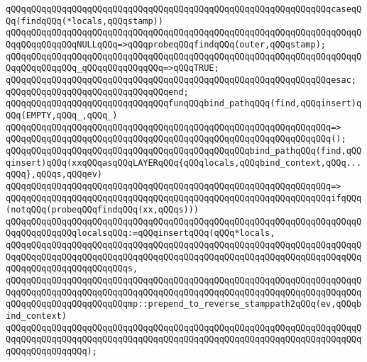\verb|qQQqqQQqqQQqqQQqqQQqqQQqqQQqqQQqqQQqqQQqqQQqqQQqqQQqqQQqqQQqqQQqcaseqQQq(findqQQq(*locals,qQQqstamp))|\newline
\verb|qQQqqQQqqQQqqQQqqQQqqQQqqQQqqQQqqQQqqQQqqQQqqQQqqQQqqQQqqQQqqQQqqQQqqQQqqQQqqQQqqQQqNULLqQQq=>qQQqprobeqQQqfindqQQq(outer,qQQqstamp);|\newline
\verb|qQQqqQQqqQQqqQQqqQQqqQQqqQQqqQQqqQQqqQQqqQQqqQQqqQQqqQQqqQQqqQQqqQQqqQQqqQQqqQQqqQQq_qQQqqQQqqQQqqQQq=>qQQqTRUE;|\newline
\verb|qQQqqQQqqQQqqQQqqQQqqQQqqQQqqQQqqQQqqQQqqQQqqQQqqQQqqQQqqQQqqQQqesac;|\newline
\verb|qQQqqQQqqQQqqQQqqQQqqQQqqQQqqQQqend;|\newline
\newline
\verb|qQQqqQQqqQQqqQQqqQQqqQQqqQQqqQQqfunqQQqbind_pathqQQq(find,qQQqinsert)qQQq(EMPTY,qQQq_,qQQq_)|\newline
\verb|qQQqqQQqqQQqqQQqqQQqqQQqqQQqqQQqqQQqqQQqqQQqqQQqqQQqqQQqqQQqqQQq=>|\newline
\verb|qQQqqQQqqQQqqQQqqQQqqQQqqQQqqQQqqQQqqQQqqQQqqQQqqQQqqQQqqQQqqQQq();|\newline
\newline
\verb|qQQqqQQqqQQqqQQqqQQqqQQqqQQqqQQqqQQqqQQqqQQqqQQqbind_pathqQQq(find,qQQqinsert)qQQq(xxqQQqasqQQqLAYERqQQq{qQQqlocals,qQQqbind_context,qQQq...qQQq},qQQqs,qQQqev)|\newline
\verb|qQQqqQQqqQQqqQQqqQQqqQQqqQQqqQQqqQQqqQQqqQQqqQQqqQQqqQQqqQQqqQQq=>|\newline
\verb|qQQqqQQqqQQqqQQqqQQqqQQqqQQqqQQqqQQqqQQqqQQqqQQqqQQqqQQqqQQqqQQqifqQQq(notqQQq(probeqQQqfindqQQq(xx,qQQqs)))|\newline
\newline
\verb|qQQqqQQqqQQqqQQqqQQqqQQqqQQqqQQqqQQqqQQqqQQqqQQqqQQqqQQqqQQqqQQqqQQqqQQqqQQqqQQqqQQqlocalsqQQq:=qQQqinsertqQQq(qQQq*locals,|\newline
\verb|qQQqqQQqqQQqqQQqqQQqqQQqqQQqqQQqqQQqqQQqqQQqqQQqqQQqqQQqqQQqqQQqqQQqqQQqqQQqqQQqqQQqqQQqqQQqqQQqqQQqqQQqqQQqqQQqqQQqqQQqqQQqqQQqqQQqqQQqqQQqqQQqqQQqqQQqqQQqqQQqqQQqs,|\newline
\verb|qQQqqQQqqQQqqQQqqQQqqQQqqQQqqQQqqQQqqQQqqQQqqQQqqQQqqQQqqQQqqQQqqQQqqQQqqQQqqQQqqQQqqQQqqQQqqQQqqQQqqQQqqQQqqQQqqQQqqQQqqQQqqQQqqQQqqQQqqQQqqQQqqQQqqQQqqQQqqQQqqQQqmp::prepend_to_reverse_stamppath2qQQq(ev,qQQqbind_context)|\newline
\verb|qQQqqQQqqQQqqQQqqQQqqQQqqQQqqQQqqQQqqQQqqQQqqQQqqQQqqQQqqQQqqQQqqQQqqQQqqQQqqQQqqQQqqQQqqQQqqQQqqQQqqQQqqQQqqQQqqQQqqQQqqQQqqQQqqQQqqQQqqQQqqQQqqQQqqQQqqQQq);|\newline
